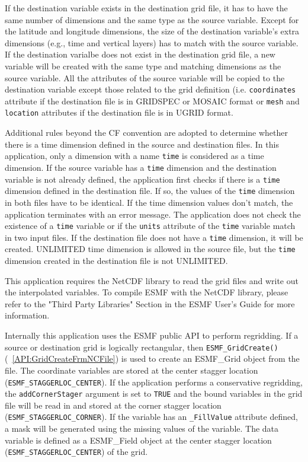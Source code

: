 If the destination 
variable exists in the destination grid file, it has to have the same number of dimensions and the same type as the source variable. Except for the latitude and longitude dimensions, the size of 
the destination variable's extra dimensions (e.g., time and vertical layers) has to match with the 
source variable.   If the destination varialbe does not exist in the destination grid file, a
new variable will be created with the same type and matching dimensions as the source variable.
All the attributes of the source variable will be copied to the destination variable except those
related to the grid definition (i.e. {\tt coordinates} attribute if the destination file is in  
GRIDSPEC or MOSAIC format or {\tt mesh} and {\tt location} attributes if the destination file is in UGRID format.

Additional rules beyond the CF convention are adopted to determine whether there is a time dimension defined
in the source and destination files.  In this application, only a dimension with a name {\tt time} is 
considered as a time dimension.
If the source variable has a {\tt time} dimension and the destination variable is not already defined, 
the application first checks if there is a {\tt time} dimension defined in the destination file.  If so, 
the values of the {\tt time} dimension in both files have to be identical.  If the time dimension values don't match, the application
terminates with an error message.  The application does not check the existence of a {\tt time} variable 
or if the {\tt units} attribute of the {\tt time} variable match in two input files.  If the destination 
file does not have a {\tt time} dimension, it will be created.  UNLIMITED time dimension is allowed in the
source file, but the {\tt time} dimension created in the destination file is not UNLIMITED.

This application requires the NetCDF library to read the grid files and write out the interpolated variables.  To compile ESMF with
the NetCDF library, please refer to the "Third Party Libraries" Section in the ESMF User's Guide for more information.

Internally this application uses the ESMF public API to perform regridding.
If a source or destination grid is logically rectangular, then {\tt ESMF\_GridCreate()}(~\ref{API:GridCreateFrmNCFile}) is used to create an ESMF\_Grid object from the file. The coordinate variables are stored
at the center stagger location ({\tt ESMF\_STAGGERLOC\_CENTER}).  If the application performs a 
conservative regridding, the {\tt addCornerStager} argument is set to {\tt TRUE} and the bound variables in the grid file will
be read  in and stored at the corner stagger location ({\tt ESMF\_STAGGERLOC\_CORNER}).  If the variable has an {\tt \_FillValue} attribute defined, a mask will be generated using the missing values of the variable. 
The data variable is defined as a ESMF\_Field object at the center stagger location ({\tt ESMF\_STAGGERLOC\_CENTER}) of the grid.   

